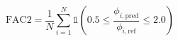 \documentclass[11pt]{article}
\begin{document}
\begin{equation*}
\text{FAC2} = \frac{1}{N}\sum_{i=1}^{N} \mathbb{1}\!\left(0.5 \leq \frac{\phi_{i,\text{pred}}}{\phi_{i,\text{ref}}} \leq 2.0\right)\tag{13}
\end{equation*}
\end{document}
